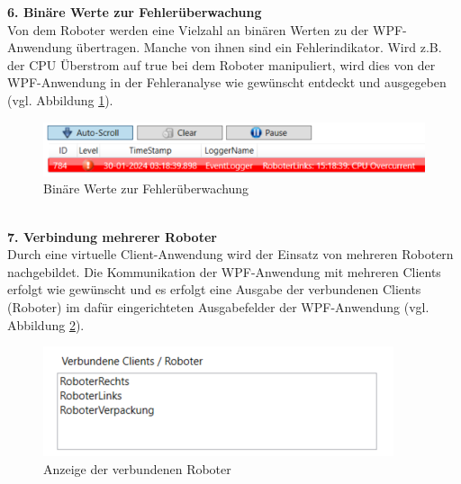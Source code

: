\documentclass[ a4paper,
                oneside,
                toc=bibliography,
                toc=listof
                ]{scrbook}
\begin{document}
   	\noindent
   	\textbf{6. Binäre Werte zur Fehlerüberwachung}\\
   	Von dem Roboter werden eine Vielzahl an binären Werten zu der WPF-Anwendung übertragen. Manche von ihnen sind ein Fehlerindikator. Wird z.B. der CPU Überstrom auf true bei dem Roboter manipuliert, wird dies von der WPF-Anwendung in der Fehleranalyse wie gewünscht entdeckt und ausgegeben (vgl. Abbildung \ref{fig:binarFehler}).
   	\begin{figure}[!h]
   		\centering
   		\includegraphics[width=0.7\linewidth]{./images/BinarFehler.png}
   		\caption{Binäre Werte zur Fehlerüberwachung}
   		\label{fig:binarFehler}
   	\end{figure}\\
   	\textbf{7. Verbindung mehrerer Roboter}\\
   	Durch eine virtuelle Client-Anwendung wird der Einsatz von mehreren Robotern nachgebildet. Die Kommunikation der WPF-Anwendung mit mehreren Clients erfolgt wie gewünscht und es erfolgt eine Ausgabe der verbundenen Clients (Roboter) im dafür eingerichteten Ausgabefelder der WPF-Anwendung (vgl. Abbildung \ref{fig:VerbundeneRoboter}).
   	\begin{figure}[!h]
   		\centering
   		\includegraphics[width=0.7\linewidth]{./images/VerbundeneRoboter.png}
   		\caption{Anzeige der verbundenen Roboter}
   		\label{fig:VerbundeneRoboter}
   	\end{figure}\\
\end{document}
